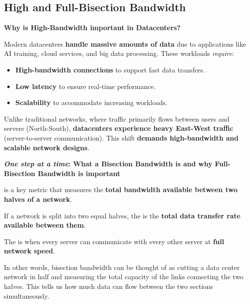 \subsection{High and Full-Bisection Bandwidth}

\begin{flushleft}
    \textcolor{Green3}{ \textbf{Why is High-Bandwidth important in Datacenters?}}
\end{flushleft}
Modern datacenters \textbf{handle massive amounts of data} due to applications like AI training, cloud services, and big data processing. These workloads \emph{require}:
\begin{itemize}
    \item \textbf{High-bandwidth connections} to support fast data transfers.
    \item \textbf{Low latency} to ensure real-time performance.
    \item \textbf{Scalability} to accommodate increasing workloads.
\end{itemize}
Unlike traditional networks, where traffic primarily flows between users and servers (North-South), \textbf{datacenters experience heavy East-West traffic} (server-to-server communication). This shift \textbf{demands high-bandwidth and scalable network designs}.

\highspace
\begin{flushleft}
    \textcolor{Green3}{ \textbf{\emph{One step at a time}: What a Bisection Bandwidth is and why Full-Bisection Bandwidth is important}}
\end{flushleft}
 is a key metric that measures the \textbf{total bandwidth available between two halves of a network}.
\begin{definitionbox}
    If a network is split into two equal halves, the  is the \textbf{total data transfer rate available between them}.
\end{definitionbox}
\begin{definitionbox}
    The  is when every server can communicate with every other server at \textbf{full network speed}.
\end{definitionbox}

\noindent
In other words, bisection bandwidth can be thought of as cutting a data center network in half and measuring the total capacity of the links connecting the two halves. This tells us how much data can flow between the two sections simultaneously.

